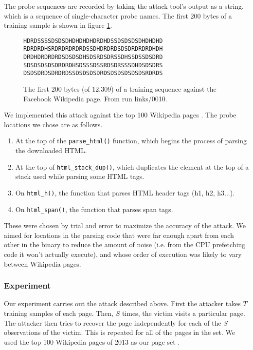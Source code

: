 \documentclass{acm_proc_article-sp}
\begin{document}
The probe sequences are recorded by taking the attack tool's output as a string,
which is a sequence of single-character probe names. The first 200 bytes of
a training sample is shown in figure \ref{figure:probetext}.

\begin{figure}
    \label{figure:probetext}
    \centering
\begin{verbatim}
HDRDSSSSDSDSDHDHDHDHDRDHDSSDSDSDSDHDHDHD
RDRDRDHSRDRDRDRDRDSSDHDRDRDSDSDRDRDRDHDH
DRDHDRDRDRDSDSDSDHSDSRDSDRSSDHSSDSSDSDRD
SDSDSDSDSDRDRDHSDSSSDSSRDSDRSSSDHDSDSDRS
DSDSDRDSDRDRDSSDSDSDSDRDSDSDSDSDSDSRDRDS
\end{verbatim}
\caption{The first 200 bytes (of 12,309) of a training sequence against the
Facebook Wikipedia page. From run links/0010.}
\end{figure}

We implemented this attack against the top 100 Wikipedia pages
\cite{wikitop2013}. The probe locations we chose are as follows.

\begin{enumerate}
    \item At the top of the \texttt{parse\_html()} function, which begins the
        process of parsing the downloaded HTML.
    \item At the top of \texttt{html\_stack\_dup()}, which duplicates the element
        at the top of a stack used while parsing some HTML tags.
    \item On \texttt{html\_h()}, the function that parses HTML header tags (h1,
        h2, h3...).
    \item On \texttt{html\_span()}, the function that parses span tags.
\end{enumerate}

These were chosen by trial and error to maximize the accuracy of the attack. We
aimed for locations in the parsing code that were far enough apart from each
other in the binary to reduce the amount of noise (i.e. from the CPU prefetching
code it won't actually execute), and whose order of execution was likely to vary
between Wikipedia pages.

\subsubsection{Experiment}

Our experiment carries out the attack described above. First the attacker takes
$T$ training samples of each page. Then, $S$ times, the victim visits
a particular page. The attacker then tries to recover the page independently for
each of the $S$ observations of the victim. This is repeated for all of the
pages in the set. We used the top 100 Wikipedia pages of 2013 as our page set
\cite{wikitop2013}.
\end{document}
